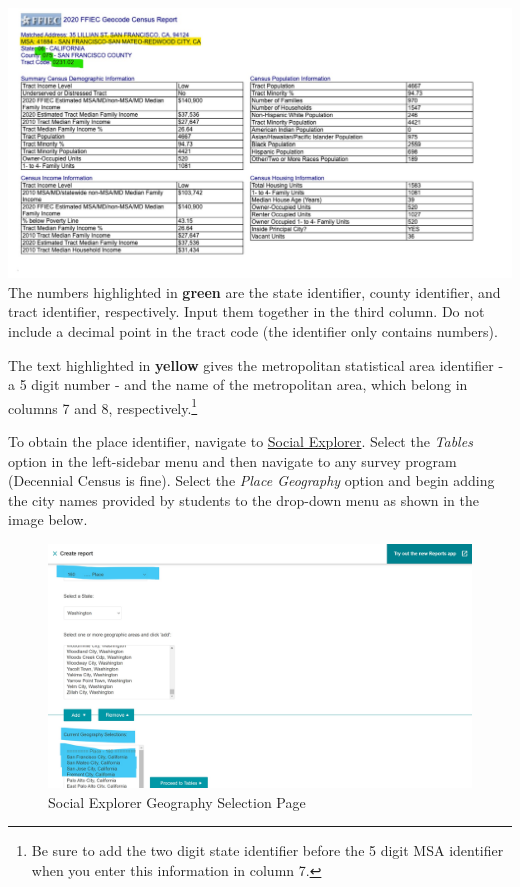 \documentclass[
]{book}
\begin{document}
\includegraphics{images/FFIEC Geocode Census Report.jpg}
The numbers highlighted in {\textbf{green}} are the state identifier, county identifier, and tract identifier, respectively. Input them together in the third column. Do not include a decimal point in the tract code (the identifier only contains numbers).

The text highlighted in {\textbf{yellow}} gives the metropolitan statistical area identifier - a 5 digit number - and the name of the metropolitan area, which belong in columns 7 and 8, respectively.\footnote{Be sure to add the two digit state identifier before the 5 digit MSA identifier when you enter this information in column 7.}

To obtain the place identifier, navigate to \href{https://library.stanford.edu/all/?q=social+explorer\&op=Search}{Social Explorer}. Select the \emph{Tables} option in the left-sidebar menu and then navigate to any survey program (Decennial Census is fine). Select the \emph{Place Geography} option and begin adding the city names provided by students to the drop-down menu as shown in the image below.

\begin{figure}
\centering
\includegraphics{images/Social Explorer Place Geographies.jpg}
\caption{Social Explorer Geography Selection Page}
\end{figure}
\end{document}
